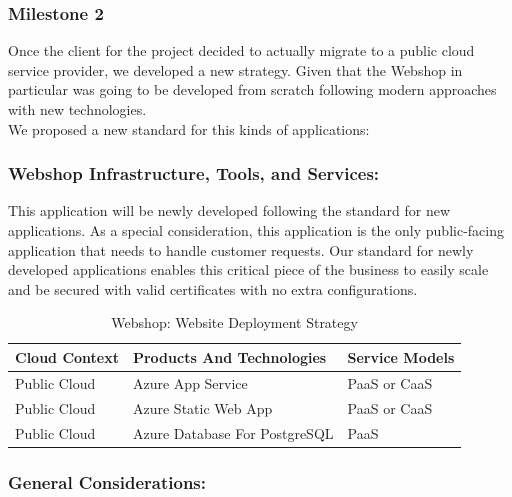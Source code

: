 \documentclass{llncs}
\begin{document}
\subsubsection{Milestone 2}

Once the client for the project decided to actually migrate to a public cloud service provider, we developed a new strategy. 
Given that the Webshop in particular was going to be developed from scratch following modern approaches with new technologies.\\
We proposed a new standard for this kinds of applications:

\subsubsection*{Webshop Infrastructure, Tools, and Services:}

This application will be newly developed following the standard for new applications.
As a special consideration, this application is the only public-facing application that needs to handle customer requests.
Our standard for newly developed applications enables this critical piece of the business to easily scale and be secured with valid certificates with no extra configurations.\\

\begin{table}[h!]
    \centering
    \begin{tabular}{lll}
        \hline
        \textbf{Cloud Context} & \textbf{Products And Technologies} & \textbf{Service Models} \\
        \hline
        Public Cloud           & Azure App Service                  & PaaS or CaaS            \\
        \hline
        Public Cloud           & Azure Static Web App               & PaaS or CaaS            \\
        \hline
        Public Cloud           & Azure Database For PostgreSQL      & PaaS                    \\
        \hline
    \end{tabular}
    \caption{Webshop: Website Deployment Strategy}
\end{table}

\subsubsection*{General Considerations:}
\end{document}
